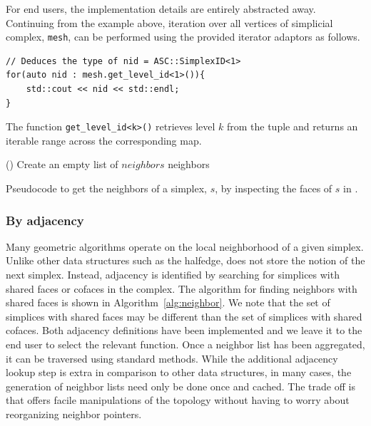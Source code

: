 		\par For end users, the implementation details are entirely abstracted away. Continuing from the example above, iteration over all vertices of simplicial complex, \verb|mesh|, can be performed using the provided iterator adaptors as follows.
\begin{lstlisting}[caption={Example use of iterator adaptors for traversal across vertices of mesh.},captionpos=b]
// Deduces the type of nid = ASC::SimplexID<1>
for(auto nid : mesh.get_level_id<1>()){
	std::cout << nid << std::endl;
}
\end{lstlisting}
		The function \verb|get_level_id<k>()| retrieves level $k$ from the tuple and returns an iterable range across the corresponding map.

\begin{algorithm}[ht!]


\SetStartEndCondition{ (}{)}{)}
\AlgoDisplayBlockMarkers\AlgoDisplayGroupMarkers\SetAlgoBlockMarkers{ \{}{ \}\ }%
\SetAlgoNoEnd\SetAlgoNoLine\DontPrintSemicolon
\SetStartEndCondition{ (}{)}{)}

\medskip
\Fn(){}{
	Create an empty list of $neighbors$\;
	\Return neighbors
}

\caption{Pseudocode to get the neighbors of a simplex, $s$, by inspecting the faces of $s$ in \asc.}
\label{alg:neighbor}
\end{algorithm}
	\subsubsection{By adjacency}
		\par Many geometric algorithms operate on the local neighborhood of a given simplex. Unlike other data structures such as the halfedge, \asc does not store the notion of the next simplex. Instead, adjacency is identified by searching for simplices with shared faces or cofaces in the complex. The algorithm for finding neighbors with shared faces is shown in Algorithm~\ref{alg:neighbor}. We note that the set of simplices with shared faces may be different than the set of simplices with shared cofaces. Both adjacency definitions have been implemented and we leave it to the end user to select the relevant function. Once a neighbor list has been aggregated, it can be traversed using standard methods. While the additional adjacency lookup step is extra in comparison to other data structures, in many cases, the generation of neighbor lists need only be done once and cached. The trade off is that \asc offers facile manipulations of the topology without having to worry about reorganizing neighbor pointers.


